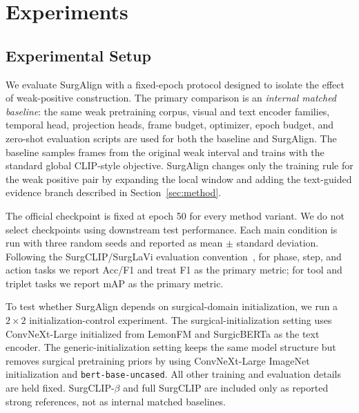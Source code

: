 \section{Experiments}
\label{sec:experiments}

\subsection{Experimental Setup}
\label{sec:exp_data}

We evaluate SurgAlign with a fixed-epoch protocol designed to isolate the effect of weak-positive construction. The primary comparison is an \emph{internal matched baseline}: the same weak pretraining corpus, visual and text encoder families, temporal head, projection heads, frame budget, optimizer, epoch budget, and zero-shot evaluation scripts are used for both the baseline and SurgAlign. The baseline samples frames from the original weak interval and trains with the standard global CLIP-style objective. SurgAlign changes only the training rule for the weak positive pair by expanding the local window and adding the text-guided evidence branch described in Section~\ref{sec:method}.

The official checkpoint is fixed at epoch 50 for every method variant. We do not select checkpoints using downstream test performance. Each main condition is run with three random seeds and reported as mean $\pm$ standard deviation. Following the SurgCLIP/SurgLaVi evaluation convention~\cite{surglavi2025}, for phase, step, and action tasks we report Acc/F1 and treat F1 as the primary metric; for tool and triplet tasks we report mAP as the primary metric.

To test whether SurgAlign depends on surgical-domain initialization, we run a $2\times2$ initialization-control experiment. The surgical-initialization setting uses ConvNeXt-Large initialized from LemonFM and SurgicBERTa as the text encoder. The generic-initialization setting keeps the same model structure but removes surgical pretraining priors by using ConvNeXt-Large ImageNet initialization and \texttt{bert-base-uncased}. All other training and evaluation details are held fixed. SurgCLIP-$\beta$ and full SurgCLIP are included only as reported strong references, not as internal matched baselines.

